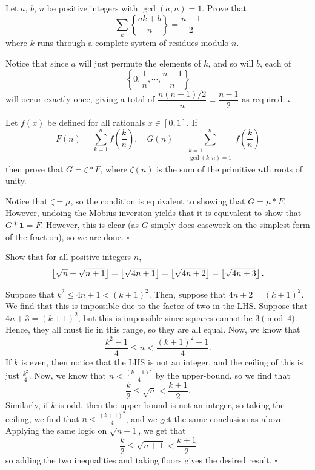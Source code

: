 \documentclass{article}
\begin{document}
\begin{problem}[3.7.2]{}
Let $a$, $b$, $n$ be positive integers with $\gcd(a, n) = 1$. Prove that \[\sum_k\left\{\dfrac{ak+b}{n}\right\} = \dfrac{n-1}{2}\] where $k$ runs through a complete system of residues modulo $n$.
\end{problem}

Notice that since $a$ will just permute the elements of $k$, and so will $b$, each of \[\left\{0, \dfrac{1}{n}, \cdots, \dfrac{n-1}{n}\right\}\] will occur exactly once, giving a total of $\dfrac{n(n-1)/2}{n} = \boxed{\dfrac{n-1}{2}}$ as required. $\square$

\begin{problem}[3.7.3]{}
Let $f(x)$ be defined for all rationals $x \in [0, 1]$. If \[F(n) = \sum_{k=1}^n f\left(\dfrac{k}{n}\right), \quad G(n) = \sum_{\substack{k=1 \\ \gcd(k, n) = 1}}^n f\left(\dfrac{k}{n}\right)\] then prove that $G = \zeta * F$, where $\zeta(n)$ is the sum of the primitive $n$th roots of unity.
\end{problem}

Notice that $\zeta = \mu$, so the condition is equivalent to showing that $G = \mu * F$. However, undoing the Mobius inversion yields that it is equivalent to show that $G * \mathbf{1} = F$. However, this is clear (as $G$ simply does casework on the simplest form of the fraction), so we are done. $\square$

\begin{problem}[3.7.4]{}
Show that for all positive integers $n$, \[\left\lfloor \sqrt{n}+\sqrt{n+1} \right\rfloor = \left\lfloor \sqrt{4n+1} \right\rfloor = \left\lfloor \sqrt{4n+2} \right\rfloor = \left\lfloor \sqrt{4n+3} \right\rfloor.\]
\end{problem}

Suppose that $k^2 \le 4n+1 < (k+1)^2$. Then, suppose that $4n+2 = (k+1)^2$. We find that this is impossible due to the factor of two in the LHS. Suppose that $4n+3 = (k+1)^2$, but this is impossible since squares cannot be $3 \pmod{4}$. Hence, they all must lie in this range, so they are all equal. Now, we know that \[\dfrac{k^2-1}{4} \le n < \dfrac{(k+1)^2-1}{4}.\] If $k$ is even, then notice that the LHS is not an integer, and the ceiling of this is just $\tfrac{k^2}{4}$. Now, we know that $n < \tfrac{(k+1)^2}{4}$ by the upper-bound, so we find that \[\dfrac{k}{2} \le \sqrt{n} < \dfrac{k+1}{2}.\] Similarly, if $k$ is odd, then the upper bound is not an integer, so taking the ceiling, we find that $n < \tfrac{(k+1)^2}{4}$, and we get the same conclusion as above. Applying the same logic on $\sqrt{n+1}$, we get that \[\dfrac{k}{2} \le \sqrt{n+1} < \dfrac{k+1}{2}\] so adding the two inequalities and taking floors gives the desired result. $\square$
\end{document}

